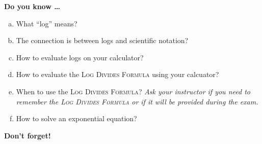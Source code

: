 \newpage



\bigskip

\noindent \textbf{Do you know \ldots} %

\begin{enumerate} [(a)]
\item What ``log'' means? 
\item The connection is between logs and scientific notation? 
\item How to evaluate logs on your calculator? 
\item How to evaluate the \textsc{Log Divides Formula} using your calcuator? 
\item When to use the \textsc{Log Divides Formula}?  \emph{Ask your instructor if you need to remember the \textsc{Log Divides Formula} or if it will be provided during the exam.}
\item How to solve an exponential equation? 
\end{enumerate}

\bigskip

\noindent \textbf{Don't forget!}
